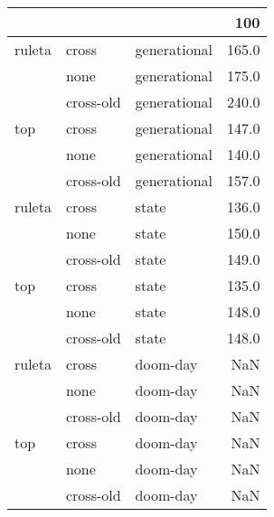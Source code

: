 \begin{tabular}{lllr}
\toprule
    &           &          &    100 \\
\midrule
ruleta & cross & generational &  165.0 \\
    & none & generational &  175.0 \\
    & cross-old & generational &  240.0 \\
top & cross & generational &  147.0 \\
    & none & generational &  140.0 \\
    & cross-old & generational &  157.0 \\
ruleta & cross & state &  136.0 \\
    & none & state &  150.0 \\
    & cross-old & state &  149.0 \\
top & cross & state &  135.0 \\
    & none & state &  148.0 \\
    & cross-old & state &  148.0 \\
ruleta & cross & doom-day &    NaN \\
    & none & doom-day &    NaN \\
    & cross-old & doom-day &    NaN \\
top & cross & doom-day &    NaN \\
    & none & doom-day &    NaN \\
    & cross-old & doom-day &    NaN \\
\bottomrule
\end{tabular}
